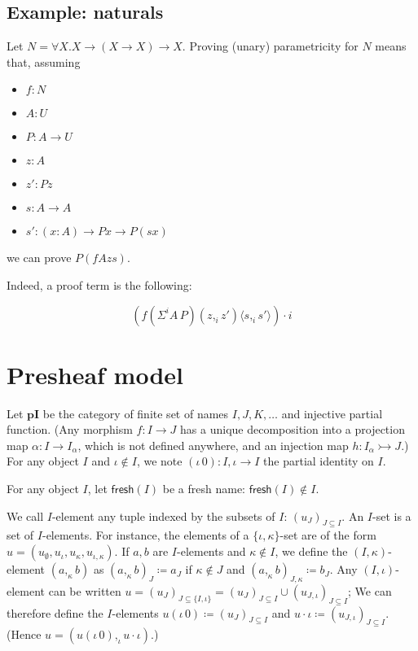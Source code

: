 \documentclass{PaperTools/latex/llncs}
\newcommand\CP[3]{(#2,_{#1} #3)}
\newcommand\param[1]{\!\cdot\!#1}
\newcommand\ip[3]{Σ^{#1} {#2}\,{#3}}
\newcommand\fp[3]{⟨#2 ,_{#1} #3⟩}
\def\pI{\ensuremath{\mathbf{pI}}}
\def\fresh#1{\mathsf{fresh}(#1)}
\begin{document}
\subsection{Example: naturals}
Let $N = ∀X. X → (X → X) → X$.
Proving (unary) parametricity for $N$ means that, assuming
\begin{itemize}
\item $f : N$
\item $A : U$
\item $P : A → U$
\item $z : A$
\item $z' : P z$
\item $s : A → A$
\item $s' : (x:A) → P x → P (s x)$
\end{itemize}
we can prove $P (f A z s)$.

Indeed, a proof term is the following:

\[
(f (\ip i A P) \CP i z {z'} \fp i s {s'}) \param i
\]

\section{Presheaf model}

Let \pI{} be the category of finite set of names $I,J,K,…$ and injective
partial function.  (Any morphism $f : I → J$ has a unique decomposition
into a projection map $α : I → I_α$, which is not defined anywhere, and
an injection map $h : I_α ↣ J$.)  For any object $I$ and $ι ∉ I$, we note
$(ι \, 0) : I,ι → I$ the partial identity on $I$.


For any object $I$, let $\fresh{I}$ be a fresh name: $\fresh{I} ∉ I$.

\bigskip
We call $I$-element any tuple indexed by the subsets of $I$: $(u_J)_{J ⊆ I}$.
An $I$-set is a set of $I$-elements.  For instance, the elements of a
$\{ι,κ\}$-set are of the form $u = (u_∅,u_ι,u_κ,u_{ι,κ})$.
%
If $a,b$ are $I$-elements and $κ ∉ I$, we define the $(I,κ)$-element
$(a ,_κ b)$ as $(a ,_κ b)_J ≔ a_J$ if $κ ∉ J$ and $(a ,_κ b)_{J,κ} ≔ b_J$.
%
Any $(I,ι)$-element can be written $u = (u_J)_{J ⊆ \{I,ι\}} = (u_J)_{J ⊆ I} ∪ (u_{J,ι})_{J ⊆ I}$;
We can therefore define the $I$-elements $u (ι\,0) ≔ (u_J)_{J ⊆ I}$ and $u · ι ≔ (u_{J,ι})_{J ⊆ I}$.
(Hence $u = (u (ι\,0) ,_ι u · ι)$.)
\end{document}
